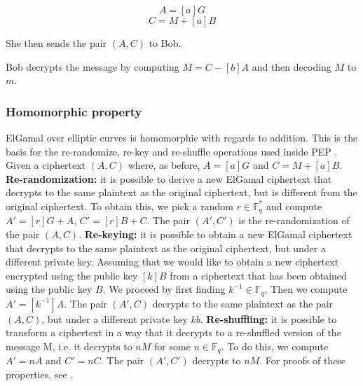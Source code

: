 \documentclass{report}
\begin{document}
$$A=[a]G$$
$$C=M+[a]B$$

She then sends the pair $(A, C)$ to Bob. \par
Bob decrypts the message by computing $M=C-[b]A$ and then decoding $M$ to $m$.

\subsubsection{Homomorphic property}
ElGamal over elliptic curves is homomorphic with regards to addition. This is the basis for the re-randomize, re-key and re-shuffle operations used inside PEP \cite{peppaper}.
\newline \newline
Given a ciphertext $(A, C)$ where, as before, $A=[a]G$ and $C=M+[a]B$.
\textbf{Re-randomization:} it is possible to derive a new ElGamal ciphertext that decrypts to the same plaintext as the original ciphertext, but is different from the original
ciphertext. To obtain this, we pick a random $r \in \mathds{F}^*_q$ and compute $A'=[r]G+A$, $C'=[r]B+C$. The pair $(A', C')$ is the re-randomization of the pair $(A, C)$. \newline
\textbf{Re-keying:} it is possible to obtain a new ElGamal ciphertext that decrypts to the same plaintext as the original ciphertext, but under a different private key. Assuming
that we would like to obtain a new ciphertext encrypted using the public key $[k]B$ from a ciphertext that has been obtained using the public key $B$. We proceed by first
finding $k^{-1} \in \mathds{F}_q$. Then we compute $A'=[k^{-1}]A$. The pair $(A', C)$ decrypts to the same plaintext as the pair $(A, C)$, but under a different private key $kb$.
\newline
\textbf{Re-shuffling:} it is possible to transform a ciphertext in a way that it decrypts to a re-shuffled version of the message M, i.e. it decrypts to $nM$ for some $n \in
\mathds{F}_q$. To do this, we compute $A'=nA$ and $C'=nC$. The pair $(A', C')$ decrypts to $nM$. \newline
For proofs of these properties, see \cite{pep-whitepaper}. 
\end{document}
